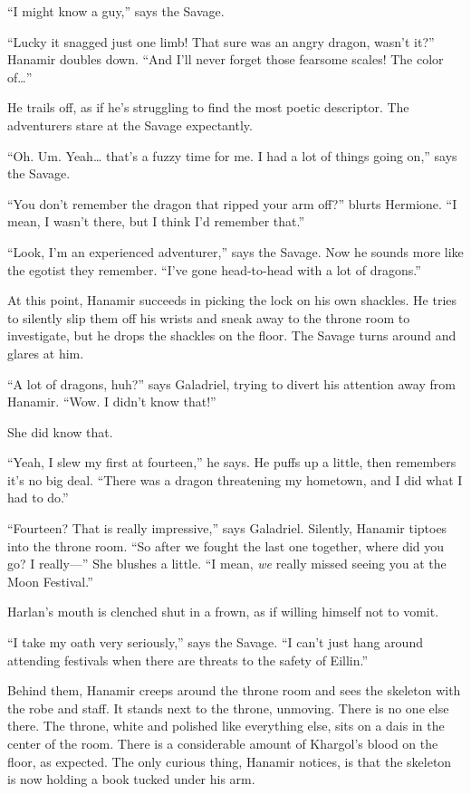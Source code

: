 \documentclass[smalldemyvopaper,11pt,twoside,onecolumn,openright,extrafontsizes]{memoir}
\newlength\drop
\begin{document}
``I might know a guy,'' says the Savage.

``Lucky it snagged just one limb! That sure was an angry dragon, wasn't
it?'' Hanamir doubles down. ``And I'll never forget those fearsome
scales! The color of\ldots{}''

He trails off, as if he's struggling to find the most poetic descriptor.
The adventurers stare at the Savage expectantly.

``Oh. Um. Yeah\ldots{} that's a fuzzy time for me. I had a lot of things
going on,'' says the Savage.

``You don't remember the dragon that ripped your arm off?'' blurts
Hermione. ``I mean, I wasn't there, but I think I'd remember that.''

``Look, I'm an experienced adventurer,'' says the Savage. Now he sounds
more like the egotist they remember. ``I've gone head-to-head with a lot
of dragons.''

At this point, Hanamir succeeds in picking the lock on his own shackles.
He tries to silently slip them off his wrists and sneak away to the
throne room to investigate, but he drops the shackles on the floor. The
Savage turns around and glares at him.

``A lot of dragons, huh?'' says Galadriel, trying to divert his
attention away from Hanamir. ``Wow. I didn't know that!''

She did know that.

``Yeah, I slew my first at fourteen,'' he says. He puffs up a little,
then remembers it's no big deal. ``There was a dragon threatening my
hometown, and I did what I had to do.''

``Fourteen? That is really impressive,'' says Galadriel. Silently,
Hanamir tiptoes into the throne room. ``So after we fought the last one
together, where did you go? I really---'' She blushes a little. ``I
mean, \emph{we} really missed seeing you at the Moon Festival.''

Harlan's mouth is clenched shut in a frown, as if willing himself not to
vomit.

``I take my oath very seriously,'' says the Savage. ``I can't just hang
around attending festivals when there are threats to the safety of
Eillin.''

Behind them, Hanamir creeps around the throne room and sees the skeleton
with the robe and staff. It stands next to the throne, unmoving. There
is no one else there. The throne, white and polished like everything
else, sits on a dais in the center of the room. There is a considerable
amount of Khargol's blood on the floor, as expected. The only curious
thing, Hanamir notices, is that the skeleton is now holding a book
tucked under his arm.
\end{document}
